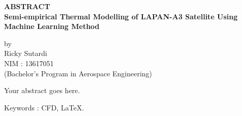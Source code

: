 \newpage

\begin{center}
       \Large
       \textbf{ABSTRACT} \\
        \vspace{1.5cm}
        \large
        \textbf{Semi-empirical Thermal Modelling of LAPAN-A3 Satellite Using Machine Learning Method}\\
        
        \vspace{1.5cm}
        
        by\\
        Ricky Sutardi\\
        NIM : 13617051\\
        (Bachelor's Program in Aerospace Engineering)\\
        \vspace{1.5cm}
\end{center}

Your abstract goes here.

\vspace{1.0cm}
\noindent 
Keywords : CFD, \LaTeX. 
